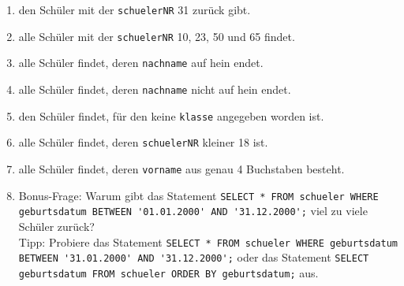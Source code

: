 \begin{Exercise}[title={Erstelle ein SELECT-Statement mit WHERE-Klausel, das}, label=Where]
	\begin{enumerate}
		\item den Schüler mit der \lstinline!schuelerNR! 31 zurück gibt.
		\item alle Schüler mit der \lstinline!schuelerNR! 10, 23, 50 und 65 findet.
		\item alle Schüler findet, deren \lstinline!nachname! auf hein endet.
		\item alle Schüler findet, deren \lstinline!nachname! nicht auf hein endet.
		\item den Schüler findet, für den keine \lstinline!klasse! angegeben worden ist.
		\item alle Schüler findet, deren \lstinline!schuelerNR! kleiner 18 ist.
		\item alle Schüler findet, deren \lstinline!vorname! aus genau 4 Buchstaben besteht.
		\item Bonus-Frage: Warum gibt das Statement \lstinline!SELECT * FROM schueler WHERE geburtsdatum BETWEEN '01.01.2000' AND '31.12.2000';! viel zu viele Schüler zurück?\\
		Tipp: Probiere das Statement \lstinline!SELECT * FROM schueler WHERE geburtsdatum BETWEEN '31.01.2000' AND '31.12.2000';! oder das Statement \lstinline!SELECT geburtsdatum FROM schueler ORDER BY geburtsdatum;! aus.\\
	\end{enumerate}
\end{Exercise}
